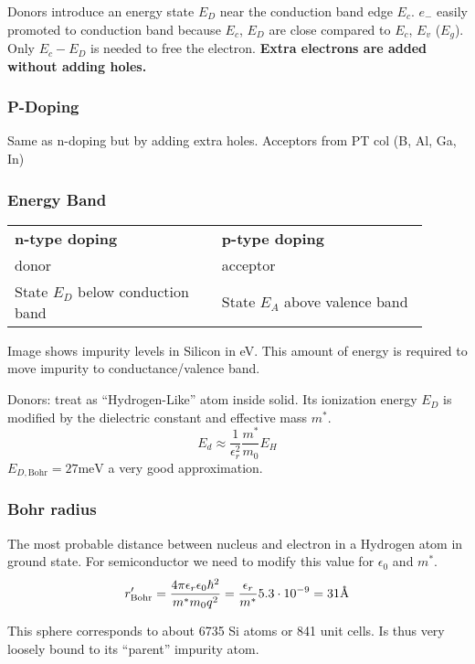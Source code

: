 \documentclass[a4paper, fontsize=8pt, landscape, DIV=1]{scrartcl}
\begin{document}
\begin{multicols*}{4}
  Donors introduce an energy state $E_D$ near the conduction band edge $E_c$. $e_-$ easily promoted to conduction band because $E_c$, $E_D$ are close compared to $E_c$, $E_v$ ($E_g$). Only $E_c-E_D$ is needed to free the electron. \textbf{Extra electrons are added without adding holes.}

  \subsubsection{P-Doping}
  Same as n-doping but by adding extra holes. Acceptors from PT col  (B, Al, Ga, In)

  \subsubsection{Energy Band}
    \begin{tabular}[h]{p{0.45\linewidth} | p{0.45\linewidth}}
    \textbf{n-type doping} & \textbf{p-type doping} \\
    donor & acceptor \\
    State $E_D$ below conduction band & State $E_A$ above valence band \\

  \end{tabular}

  Image shows impurity levels in Silicon in eV. This amount of energy is required to move impurity to conductance/valence band.

  Donors: treat as ``Hydrogen-Like'' atom inside solid. Its ionization energy $E_D$ is modified by the dielectric constant and effective mass $m^*$.
  \[E_d\approx \frac{1}{\epsilon_r^2}\frac{m^*}{m_0}E_H\]
  $E_{D,\text{Bohr}} = 27\text{meV}$ a very good approximation.

  \subsubsection{Bohr radius}
  The most probable distance between nucleus and electron in a Hydrogen atom in ground state. For semiconductor we need to modify this value for $\epsilon_0$ and $m^*$.
  \[r'_{\text{Bohr}}=\frac{4\pi\epsilon_r\epsilon_0\hbar^2}{m^*m_0q^2} = \frac{\epsilon_r}{m^*}5.3\cdot10^{-9}=31\textup{\AA}\]

  This sphere corresponds to about 6735  Si atoms or 841 unit cells. Is thus very loosely bound to its ``parent'' impurity atom.


\end{multicols*}
\end{document}
